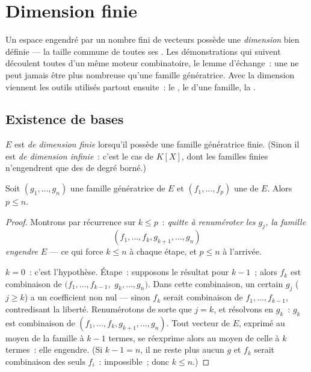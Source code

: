 \chapter{Dimension finie}\label{ch:b1:findim}

Un espace engendré par un nombre fini de vecteurs possède une
\emph{dimension} bien définie --- la taille commune de toutes ses
. Les démonstrations qui suivent découlent toutes d'un même
moteur combinatoire, le lemme d'échange~: une  ne peut
jamais être plus nombreuse qu'une famille génératrice. Avec la
dimension viennent les outils utilisés partout ensuite~: le , le  d'une famille, la .

\section{Existence de bases}

\begin{definition}\label{def:b1:findim:def}
$E$ est \emph{de dimension finie} lorsqu'il
possède une famille génératrice finie. (Sinon il est \emph{de dimension
infinie}~: c'est le cas de $K[X]$, dont les familles finies
n'engendrent que des  de degré borné.)
\end{definition}

\begin{theorem}\label{thm:b1:findim:exchange}
Soit $(g_1, \dots, g_n)$ une famille génératrice de $E$ et $(f_1,
\dots, f_p)$ une  de $E$. Alors $p \leq n$.
\end{theorem}

\begin{proof}
Montrons par récurrence sur $k \leq p$~: \emph{quitte à renuméroter
les $g_j$, la famille}
\[
(f_1, \dots, f_k, g_{k+1}, \dots, g_n)
\]
\emph{engendre $E$} --- ce qui force $k \leq n$ à chaque étape, et
$p \leq n$ à l'arrivée.

$k = 0$~: c'est l'hypothèse. Étape~: supposons le résultat pour $k -
1$~; alors $f_k$ est combinaison de $(f_1, \dots, f_{k-1},$ $g_k,
\dots, g_n)$. Dans cette combinaison, un certain $g_j$ ($j \geq k$) a
un coefficient non nul
---
sinon $f_k$ serait combinaison de $f_1, \dots, f_{k-1}$, contredisant
la liberté. Renumérotons de sorte que $j = k$, et résolvons en $g_k$~:
$g_k$ est combinaison de $(f_1, \dots, f_k, g_{k+1}, \dots,
g_n)$. Tout vecteur de $E$, exprimé au moyen de la famille à $k-1$
termes, se réexprime alors au moyen de celle à $k$ termes~: elle
engendre. (Si $k - 1 = n$, il ne reste plus aucun $g$ et $f_k$ serait
combinaison des seuls $f_i$~: impossible~; donc $k \leq n$.)
\end{proof}

